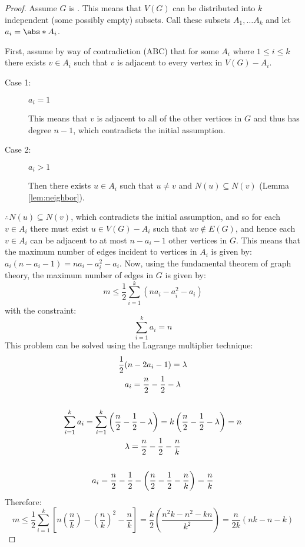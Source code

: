 \begin{proof}
  Assume \(G\) is .  This means that \(V(G)\) can be distributed into \(k\) independent (some possibly empty)
  subsets.  Call these subsets \(A_1,\ldots A_k\) and let \(a_i=\abs*{A_i}\).

  First, assume by way of contradiction (ABC) that for some \(A_i\) where \(1\le i\le k\) there exists \(v\in A_i\) such that
  \(v\) is adjacent to every vertex in \(V(G)-A_i\).

  \begin{description}
  \item[Case 1:] \(a_i=1\)

    This means that \(v\) is adjacent to all of the other vertices in \(G\) and thus has degree \(n-1\), which contradicts
    the initial assumption.

  \item[Case 2:] \(a_i>1\)

    Then there exists \(u\in A_i\) such that \(u\ne v\) and \(N(u)\subseteq N(v)\) (Lemma \ref{lem:neighbor}).
  \end{description}

  \(\therefore N(u)\subseteq N(v)\), which contradicts the initial assumption, and so for each \(v\in A_i\) there must exist
  \(u\in V(G)-A_i\) such that \(uv\notin E(G)\), and hence each \(v\in A_i\) can be adjacent to at most \(n-a_i-1\) other
  vertices in \(G\).  This means that the maximum number of edges incident to vertices in \(A_i\) is given by:
  \(a_i(n-a_i-1)=na_i-a_i^2-a_i\).  Now, using the fundamental theorem of graph theory, the maximum number of edges in \(G\) is
  given by:
  \[m\le\frac{1}{2}\sum_{i=1}^k(na_i-a_i^2-a_i)\]
  with the constraint:
  \[\sum_{i=1}^ka_i=n\]
  This problem can be solved using the Lagrange multiplier technique:
  \begin{gather*}
    \frac{1}{2}(n-2a_i-1)=\lambda \\
    a_i=\frac{n}{2}-\frac{1}{2}-\lambda \\
    \\
    \sum_{i=1}^ka_i=\sum_{i=1}^k\left(\frac{n}{2}-\frac{1}{2}-\lambda\right)=k\left(\frac{n}{2}-\frac{1}{2}-\lambda\right)=n \\
    \lambda=\frac{n}{2}-\frac{1}{2}-\frac{n}{k} \\
    \\
    a_i=\frac{n}{2}-\frac{1}{2}-\left(\frac{n}{2}-\frac{1}{2}-\frac{n}{k}\right)=\frac{n}{k}
  \end{gather*}
  Therefore:
  \[m\le\frac{1}{2}\sum_{i=1}^k\left[n\left(\frac{n}{k}\right)-\left(\frac{n}{k}\right)^2-\frac{n}{k}\right]=
  \frac{k}{2}\left(\frac{n^2k-n^2-kn}{k^2}\right)=\frac{n}{2k}(nk-n-k)\]
\end{proof}

